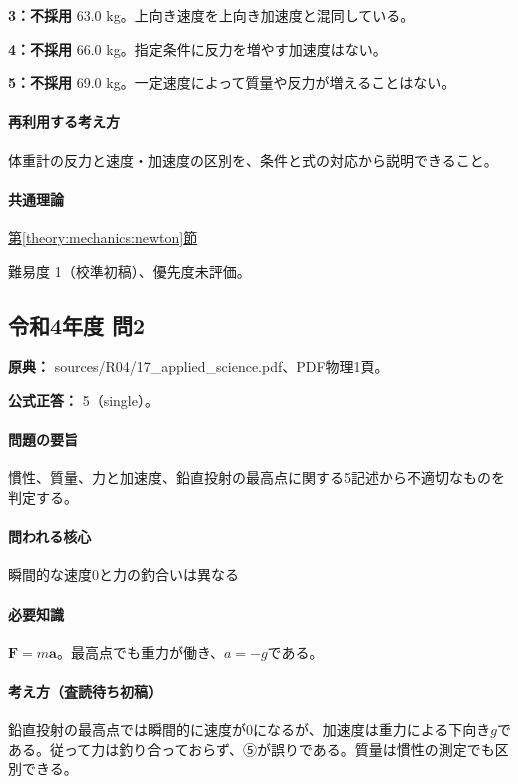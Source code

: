 \noindent\textbf{3：不採用} 63.0 kg。上向き速度を上向き加速度と混同している。\par

\noindent\textbf{4：不採用} 66.0 kg。指定条件に反力を増やす加速度はない。\par

\noindent\textbf{5：不採用} 69.0 kg。一定速度によって質量や反力が増えることはない。\par

\paragraph{再利用する考え方} 体重計の反力と速度・加速度の区別を、条件と式の対応から説明できること。

\paragraph{共通理論} \hyperref[theory:mechanics:newton]{第\ref*{theory:mechanics:newton}節}

\par 難易度 1（校準初稿）、優先度未評価。

\subsection{令和4年度 問2}
\label{q:r04-reg-applied-02}

\noindent\textbf{原典：} sources/R04/17\_applied\_science.pdf、PDF物理1頁。

\textbf{公式正答：} 5（single）。

\paragraph{問題の要旨} 慣性、質量、力と加速度、鉛直投射の最高点に関する5記述から不適切なものを判定する。

\paragraph{問われる核心} 瞬間的な速度0と力の釣合いは異なる

\paragraph{必要知識} \(\mathbf F=m\mathbf a\)。最高点でも重力が働き、\(a=-g\)である。

\paragraph{考え方（査読待ち初稿）} 鉛直投射の最高点では瞬間的に速度が0になるが、加速度は重力による下向き\(g\)である。従って力は釣り合っておらず、⑤が誤りである。質量は慣性の測定でも区別できる。

